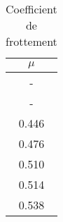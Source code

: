 \begin{table}
\centering
\begin{tabular}{|c|}
\hline
$\mu$ \\
\hline
- \\
\hline
- \\
\hline
0.446 \\
\hline
0.476 \\
\hline
0.510 \\
\hline
0.514 \\
\hline
0.538 \\
\hline
\end{tabular}
\caption{Coefficient de frottement}
\label{table:coeffpp}
\end{table}
